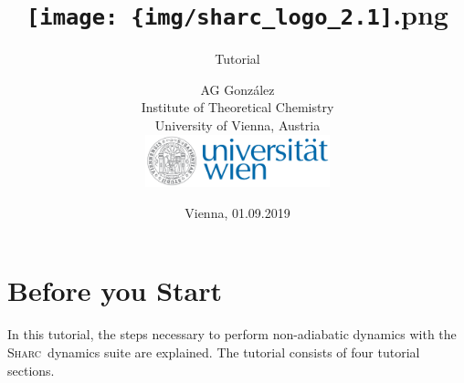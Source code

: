 \documentclass[a4paper,11pt,DIV=15,openany]{scrbook}
\title{\hspace{1cm}\texttt{[image: \{img/sharc\_logo\_2.1]}.png}\\[0.5cm]
\subtitle{Tutorial\\[1cm]}
\date{Vienna, 01.09.2019}
\author{AG Gonz\'alez\\
Institute of Theoretical Chemistry\\
University of Vienna, Austria
\vspace{1cm}
\\
\includegraphics[width=0.4\textwidth,keepaspectratio=true]{img/univie.pdf}}
\makeatletter
\newcommand{\ExternalLink}{%
      \tikz[x=1.2ex, y=1.2ex, baseline=-0.05ex]{%
          \begin{scope}[x=1ex, y=1ex]
              \clip (-0.1,-0.1) 
                  --++ (-0, 1.2) 
                  --++ (0.6, 0) 
                  --++ (0, -0.6) 
                  --++ (0.6, 0) 
                  --++ (0, -1);
              \path[draw, 
                  line width = 0.5, 
                  rounded corners=0.5] 
                  (0,0) rectangle (1,1);
          \end{scope}
          \path[draw, line width = 0.5] (0.5, 0.5) 
              -- (1, 1);
          \path[draw, line width = 0.5] (0.6, 1) 
              -- (1, 1) -- (1, 0.6);
          }
      }
\newcommand*{\link}{\begingroup\@makeother\#\@link}
\newcommand*{\@link}[2]{%
    \href{#1}{\ExternalLink\ifthenelse{\equal{#2}{}}{#1}{#2}}%
    \endgroup}
\newcommand{\sharc}{\textsc{Sharc}}
\newcommand{\todo}[1]{\textcolor{RL}{#1}}
\makeatother
\begin{document}
\tpage


\newpage
{}
\ohead{\leftmark\quad {\normalfont|} \quad\rightmark}
\ofoot[\pagemark]{\pagemark}


\tableofcontents


\chapter{Before you Start}

In this tutorial, the steps necessary to perform non-adiabatic dynamics with the \sharc\ dynamics suite are explained. 
The tutorial consists of four tutorial sections. 



\end{document}
